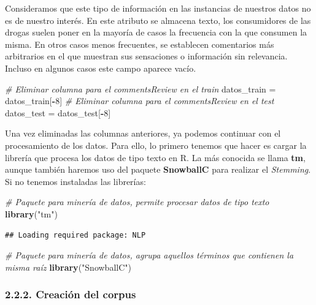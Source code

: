 \documentclass[spanish,]{article}
\newenvironment{Shaded}{\begin{snugshade}}{\end{snugshade}}
\newcommand{\CommentTok}[1]{\textcolor[rgb]{0.56,0.35,0.01}{\textit{#1}}}
\newcommand{\DecValTok}[1]{\textcolor[rgb]{0.00,0.00,0.81}{#1}}
\newcommand{\KeywordTok}[1]{\textcolor[rgb]{0.13,0.29,0.53}{\textbf{#1}}}
\newcommand{\NormalTok}[1]{#1}
\newcommand{\OperatorTok}[1]{\textcolor[rgb]{0.81,0.36,0.00}{\textbf{#1}}}
\newcommand{\StringTok}[1]{\textcolor[rgb]{0.31,0.60,0.02}{#1}}
\begin{document}
Consideramos que este tipo de información en las instancias de nuestros
datos no es de nuestro interés. En este atributo se almacena texto, los
consumidores de las drogas suelen poner en la mayoría de casos la
frecuencia con la que consumen la misma. En otros casos menos
frecuentes, se establecen comentarios más arbitrarios en el que muestran
sus sensaciones o información sin relevancia. Incluso en algunos casos
este campo aparece vacío.

\begin{Shaded}
\begin{Highlighting}[]
\CommentTok{# Eliminar columna para el commentsReview en el train}
\NormalTok{datos_train =}\StringTok{ }\NormalTok{datos_train[}\OperatorTok{-}\DecValTok{8}\NormalTok{]}
\CommentTok{# Eliminar columna para el commentsReview en el test}
\NormalTok{datos_test =}\StringTok{ }\NormalTok{datos_test[}\OperatorTok{-}\DecValTok{8}\NormalTok{]}
\end{Highlighting}
\end{Shaded}

Una vez eliminadas las columnas anteriores, ya podemos continuar con el
procesamiento de los datos. Para ello, lo primero tenemos que hacer es
cargar la librería que procesa los datos de tipo texto en R. La más
conocida se llama \textbf{tm}, aunque también haremos uso del paquete
\textbf{SnowballC} para realizar el \emph{Stemming}. Si no tenemos
instaladas las librerías:

\begin{Shaded}
\begin{Highlighting}[]
\CommentTok{# Paquete para minería de datos, permite procesar datos de tipo texto}
\KeywordTok{library}\NormalTok{(}\StringTok{"tm"}\NormalTok{)}
\end{Highlighting}
\end{Shaded}

\begin{verbatim}
## Loading required package: NLP
\end{verbatim}

\begin{Shaded}
\begin{Highlighting}[]
\CommentTok{# Paquete para minería de datos, agrupa aquellos términos que contienen la misma raíz}
\KeywordTok{library}\NormalTok{(}\StringTok{"SnowballC"}\NormalTok{)}
\end{Highlighting}
\end{Shaded}

\hypertarget{creacion-del-corpus}{%
\subsubsection{2.2.2. Creación del corpus}\label{creacion-del-corpus}}
\end{document}

